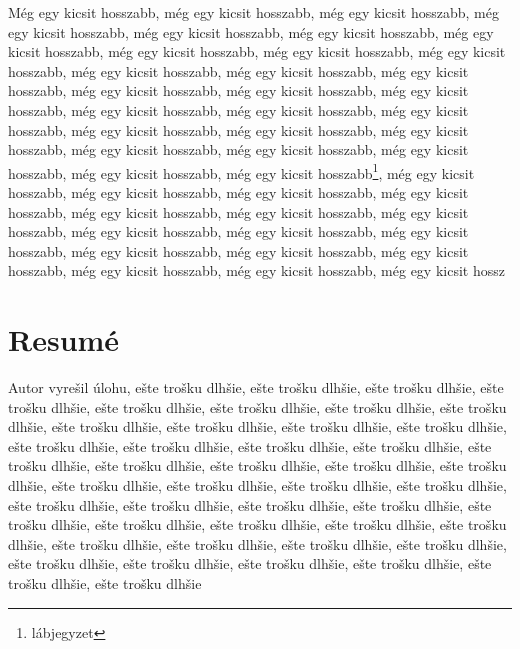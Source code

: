 \documentclass[a4paper,oneside,onecolumn,12pt]{LegrandOrangeBook}
\begin{document}
Még egy kicsit hosszabb, még egy kicsit hosszabb, még egy kicsit hosszabb, még egy kicsit hosszabb, még egy kicsit hosszabb, még egy kicsit hosszabb, még egy kicsit hosszabb, még egy kicsit hosszabb, még egy kicsit hosszabb, még egy kicsit hosszabb, még egy kicsit hosszabb, még egy kicsit hosszabb, még egy kicsit hosszabb, még egy kicsit hosszabb, még egy kicsit hosszabb, még egy kicsit hosszabb, még egy kicsit hosszabb, még egy kicsit hosszabb, még egy kicsit hosszabb, még egy kicsit hosszabb, még egy kicsit hosszabb, még egy kicsit hosszabb, még egy kicsit hosszabb, még egy kicsit hosszabb, még egy kicsit hosszabb, még egy kicsit hosszabb, még egy kicsit hosszabb\footnote{lábjegyzet}, még egy kicsit hosszabb, még egy kicsit hosszabb, még egy kicsit hosszabb, még egy kicsit hosszabb, még egy kicsit hosszabb, még egy kicsit hosszabb, még egy kicsit hosszabb, még egy kicsit hosszabb, még egy kicsit hosszabb, még egy kicsit hosszabb, még egy kicsit hosszabb, még egy kicsit hosszabb, még egy kicsit hosszabb, még egy kicsit hosszabb, még egy kicsit hosszabb, még egy kicsit hossz


\pagebreak
\chapter*{Resumé}

Autor vyrešil úlohu, ešte trošku dlhšie, ešte trošku dlhšie, ešte trošku dlhšie, ešte trošku dlhšie, ešte trošku dlhšie, ešte trošku dlhšie, ešte trošku dlhšie, ešte trošku dlhšie, ešte trošku dlhšie, ešte trošku dlhšie, ešte trošku dlhšie, ešte trošku dlhšie, ešte trošku dlhšie, ešte trošku dlhšie, ešte trošku dlhšie, ešte trošku dlhšie, ešte trošku dlhšie, ešte trošku dlhšie, ešte trošku dlhšie, ešte trošku dlhšie, ešte trošku dlhšie, ešte trošku dlhšie, ešte trošku dlhšie, ešte trošku dlhšie, ešte trošku dlhšie, ešte trošku dlhšie, ešte trošku dlhšie, ešte trošku dlhšie, ešte trošku dlhšie, ešte trošku dlhšie, ešte trošku dlhšie, ešte trošku dlhšie, ešte trošku dlhšie, ešte trošku dlhšie, ešte trošku dlhšie, ešte trošku dlhšie, ešte trošku dlhšie, ešte trošku dlhšie, ešte trošku dlhšie, ešte trošku dlhšie, ešte trošku dlhšie, ešte trošku dlhšie, ešte trošku dlhšie, ešte trošku dlhšie

% 

\printbibliography[title=References] %
\pagebreak
\end{document}
